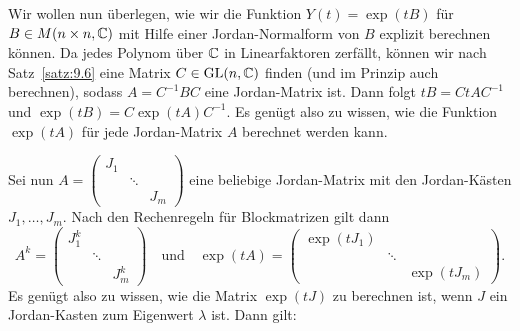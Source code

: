 \begin{anwendung}
	\label{anw:10.16}
	Wir wollen nun überlegen, wie wir die Funktion $Y(t) = \exp(tB)$ für $B \in M(n \times n,\mathbb{C})$ mit Hilfe einer Jordan-Normalform von $B$ explizit berechnen können.
	Da jedes Polynom über $\mathbb{C}$ in Linearfaktoren zerfällt, können wir nach Satz~\ref{satz:9.6} eine Matrix $C \in \operatorname{GL}(n,\mathbb{C})$ finden (und im Prinzip auch berechnen), sodass $A = C^{-1}BC$ eine Jordan-Matrix ist.
	Dann folgt $tB = CtAC^{-1}$ und $\exp(tB) = C \exp(tA)C^{-1}$.
	Es genügt also zu wissen, wie die Funktion $\exp(tA)$ für jede Jordan-Matrix $A$ berechnet werden kann.
	
	Sei nun $A = \begin{pmatrix}
	J_1 &        &  \\
	& \ddots &  \\
	&        & J_m
	\end{pmatrix}$ eine beliebige Jordan-Matrix mit den Jordan-Kästen $J_1,\dots,J_m$.
	Nach den Rechenregeln für Blockmatrizen gilt dann
	\[
	A^{k} = \begin{pmatrix}
	J_1^{k} &        &  \\
	& \ddots &  \\
	&        & J_m^{k}
	\end{pmatrix} \quad \text{und} \quad \exp(tA) =
	\begin{pmatrix}
	\exp(tJ_1) &        &  \\
	& \ddots &  \\
	&        & \exp(tJ_m)
	\end{pmatrix}.
	\]
	Es genügt also zu wissen, wie die Matrix $\exp(tJ)$ zu berechnen ist, wenn $J$ ein Jordan-Kasten zum Eigenwert $\lambda$ ist.
	Dann gilt:
	

\end{anwendung}
